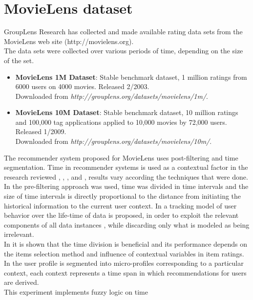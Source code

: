 \section{MovieLens dataset} 

GroupLens Research has collected and made available rating data sets
from the MovieLens  web site (http://movielens.org). \\   The data sets
were collected over various periods of time,  depending on the size of
the set.
\begin{itemize} 
	\item \textbf{MovieLens 1M Dataset}: Stable
	benchmark dataset, 1 million ratings from 6000 users on 4000 movies.
	Released 2/2003.\\ Downloaded from
	\textit{http://grouplens.org/datasets/movielens/1m/}. 
	\item \textbf{MovieLens
		10M Dataset}: Stable benchmark dataset, 10 million ratings and 100,000
	tag applications applied to 10,000 movies by 72,000 users. Released
	1/2009. \\Downloaded from
	\textit{http://grouplens.org/datasets/movielens/10m/}. 
\end{itemize}
The recommender system proposed for MovieLens uses post-filtering 
and time segmentation.
Time in recommender systems is used  as a contextual factor in the
research reviewed \cite{baltrunas2009context},
\cite{baltrunas2009towards}, \cite{koren2010collaborative}, and
\cite{he2009time}, results vary according the techniques that were
done.\\  In \cite{he2009time} the pre-filtering approach was used, time
was divided in time intervals and the size of time intervals is
directly proportional to the distance from initiating the historical
information to the current user context. In
\cite{koren2010collaborative} a tracking model of user behavior over
the life-time of data is proposed, in order to exploit the relevant
components of all  data instances , while discarding only what is
modeled as being irrelevant.\\  In \cite{baltrunas2009context} it is
shown that the time division is beneficial and its performance depends
on the items selection method and influence of contextual variables in
item ratings. In \cite{baltrunas2009towards} the user profile is
segmented into micro-profiles corresponding to a particular context,
each context represents a time span in which recommendations for users
are derived.\\  This experiment implements fuzzy logic on time
